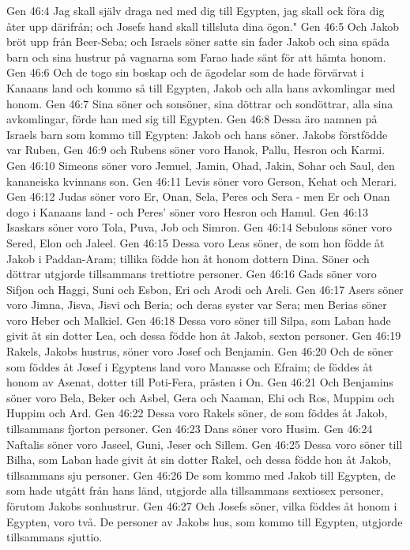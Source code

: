 Gen 46:4  Jag skall själv draga ned med dig till Egypten, jag skall ock föra dig åter upp därifrån; och Josefs hand skall tillsluta dina ögon."
Gen 46:5  Och Jakob bröt upp från Beer-Seba; och Israels söner satte sin fader Jakob och sina späda barn och sina hustrur på vagnarna som Farao hade sänt för att hämta honom.
Gen 46:6  Och de togo sin boskap och de ägodelar som de hade förvärvat i Kanaans land och kommo så till Egypten, Jakob och alla hans avkomlingar med honom.
Gen 46:7  Sina söner och sonsöner, sina döttrar och sondöttrar, alla sina avkomlingar, förde han med sig till Egypten.
Gen 46:8  Dessa äro namnen på Israels barn som kommo till Egypten: Jakob och hans söner. Jakobs förstfödde var Ruben,
Gen 46:9  och Rubens söner voro Hanok, Pallu, Hesron och Karmi.
Gen 46:10  Simeons söner voro Jemuel, Jamin, Ohad, Jakin, Sohar och Saul, den kananeiska kvinnans son.
Gen 46:11  Levis söner voro Gerson, Kehat och Merari.
Gen 46:12  Judas söner voro Er, Onan, Sela, Peres och Sera - men Er och Onan dogo i Kanaans land - och Peres' söner voro Hesron och Hamul.
Gen 46:13  Isaskars söner voro Tola, Puva, Job och Simron.
Gen 46:14  Sebulons söner voro Sered, Elon och Jaleel.
Gen 46:15  Dessa voro Leas söner, de som hon födde åt Jakob i Paddan-Aram; tillika födde hon åt honom dottern Dina. Söner och döttrar utgjorde tillsammans trettiotre personer.
Gen 46:16  Gads söner voro Sifjon och Haggi, Suni och Esbon, Eri och Arodi och Areli.
Gen 46:17  Asers söner voro Jimna, Jisva, Jisvi och Beria; och deras syster var Sera; men Berias söner voro Heber och Malkiel.
Gen 46:18  Dessa voro söner till Silpa, som Laban hade givit åt sin dotter Lea, och dessa födde hon åt Jakob, sexton personer.
Gen 46:19  Rakels, Jakobs hustrus, söner voro Josef och Benjamin.
Gen 46:20  Och de söner som föddes åt Josef i Egyptens land voro Manasse och Efraim; de föddes åt honom av Asenat, dotter till Poti-Fera, prästen i On.
Gen 46:21  Och Benjamins söner voro Bela, Beker och Asbel, Gera och Naaman, Ehi och Ros, Muppim och Huppim och Ard.
Gen 46:22  Dessa voro Rakels söner, de som föddes åt Jakob, tillsammans fjorton personer.
Gen 46:23  Dans söner voro Husim.
Gen 46:24  Naftalis söner voro Jaseel, Guni, Jeser och Sillem.
Gen 46:25  Dessa voro söner till Bilha, som Laban hade givit åt sin dotter Rakel, och dessa födde hon åt Jakob, tillsammans sju personer.
Gen 46:26  De som kommo med Jakob till Egypten, de som hade utgått från hans länd, utgjorde alla tillsammans sextiosex personer, förutom Jakobs sonhustrur.
Gen 46:27  Och Josefs söner, vilka föddes åt honom i Egypten, voro två. De personer av Jakobs hus, som kommo till Egypten, utgjorde tillsammans sjuttio.
